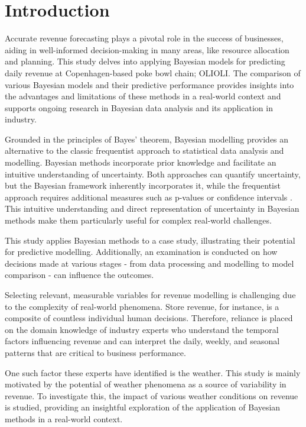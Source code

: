 \section{Introduction}


Accurate revenue forecasting plays a pivotal role in the success of
businesses, aiding in well-informed decision-making in many areas, like
resource allocation and planning. This study delves into applying Bayesian
models for predicting daily revenue at Copenhagen-based poke bowl chain;
OLIOLI. The comparison of various Bayesian models and their predictive
performance provides insights into the advantages and limitations of these
methods in a real-world context and supports ongoing research in Bayesian data
analysis and its application in industry.

Grounded in the principles of Bayes' theorem, Bayesian modelling provides an
alternative to the classic frequentist approach to statistical data analysis
and modelling. Bayesian methods incorporate prior knowledge and facilitate an
intuitive understanding of uncertainty. Both approaches can quantify
uncertainty, but the Bayesian framework inherently incorporates it, while the
frequentist approach requires additional measures such as p-values or
confidence intervals \cite{statrethinking}. This intuitive understanding and direct
representation of uncertainty in Bayesian methods make them particularly useful
for complex real-world challenges.

This study applies Bayesian methods to a case study, illustrating their
potential for predictive modelling. Additionally, an examination is conducted
on how decisions made at various stages - from data processing and modelling to
model comparison - can influence the outcomes.

Selecting relevant, measurable variables for revenue modelling is
challenging due to the complexity of real-world phenomena. Store revenue,
for instance, is a composite of countless individual human decisions.
Therefore, reliance is placed on the domain knowledge of industry experts
who understand the temporal factors influencing revenue and can interpret
the daily, weekly, and seasonal patterns that are critical to business
performance.

One such factor these experts have identified is the weather. This
study is mainly motivated by the potential of weather phenomena as a
source of variability in revenue. To investigate this, the impact of various
weather conditions on revenue is studied, providing an insightful exploration
of the application of Bayesian methods in a real-world context.

